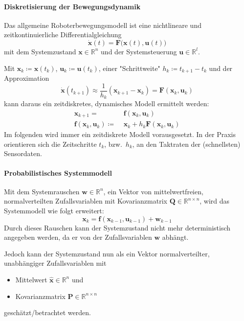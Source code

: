 \documentclass[a4paper, 11pt, accentcolor = tud3b]{tudreport}
\newcommand{\R}{\mathbb{R}}
\newcommand{\mat}[1]{\boldsymbol{#1}}
\renewcommand{\vec}[1]{\boldsymbol{#1}}
\newcommand{\bzw}{bzw.~}
\begin{document}
					\paragraph{Diskretisierung der Bewegungsdynamik}
						Das allgemeine Roboterbewegungsmodell ist eine nichtlineare und zeitkontinuierliche Differentialgleichung
						\begin{equation*}
							\dot{\vec{x}}(t) = \vec{F}\big(\vec{x}(t), \vec{u}(t)\big)
						\end{equation*}
						mit dem Systemzustand \( \vec{x} \in \R^n \) und der Systemsteuerung \( \vec{u} \in \R^l \).
						
						Mit \( \vec{x}_k \coloneqq \vec{x}(t_k) \), \( \vec{u}_k \coloneqq \vec{u}(t_k) \), einer "Schrittweite" \( h_k \coloneqq t_{k + 1} - t_k \) und der Approximation
						\begin{equation*}
							\dot{\vec{x}}(t_{k + 1}) \approx \frac{1}{h_k} (\vec{x}_{k + 1} - \vec{x}_k) = \vec{F}(\vec{x}_k, \vec{u}_k)
						\end{equation*}
						kann daraus ein zeitdiskretes, dynamisches Modell ermittelt werden:
						\begin{align*}
							\vec{x}_{k + 1} =                       & \,\, \vec{f}(\vec{x}_k, \vec{u}_k)                 \\
							\vec{f}(\vec{x}_k, \vec{u}_k) \coloneqq & \,\, \vec{x}_k + h_k \vec{F}(\vec{x}_k, \vec{u}_k)
						\end{align*}
						Im folgenden wird immer ein zeitdiskrete Modell vorausgesetzt. In der Praxis orientieren sich die Zeitschritte \( t_k \), \bzw \( h_k \), an den Taktraten der (schnellsten) Sensordaten.
					
					\paragraph{Probabilistisches Systemmodell}
						Mit dem Systemrauschen \( \vec{w} \in \R^n \), ein Vektor von mittelwertfreien, normalverteilten Zufallsvariablen mit Kovarianzmatrix \( \mat{Q} \in \R^{n \times n} \), wird das Systemmodell wie folgt erweitert:
						\begin{equation*}
							\vec{x}_k = \vec{f}(\vec{x}_{k - 1}, \vec{u}_{k - 1}) + \vec{w}_{k - 1}
						\end{equation*}
						Durch dieses Rauschen kann der Systemzustand nicht mehr deterministisch angegeben werden, da er von der Zufallsvariablen \( \vec{w} \) abhängt.
						
						Jedoch kann der Systemzustand nun als ein Vektor normalverteilter, unabhängiger Zufallsvariablen mit
						\begin{itemize}
							\item Mittelwert \( \hat{\vec{x}} \in \R^n \) und
							\item Kovarianzmatrix \( \mat{P} \in \R^{n \times n} \)
						\end{itemize}
						geschätzt/betrachtet werden.
					
\end{document}

